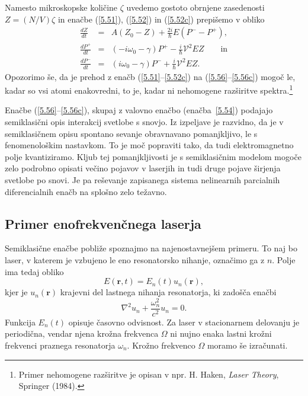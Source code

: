 Namesto mikroskopske količine $\zeta$ uvedemo gostoto obrnjene
zasedenosti $Z=(N/V)\zeta$ in enačbe (\ref{5.51}), (\ref{5.52}) in (\ref{5.52c})
prepišemo v obliko 
\begin{eqnarray}
\frac{dZ}{dt} &=& A\left(Z_0-Z\right)+\frac{2i}{\hslash}E\left(P^- - P^+\right), \label{5.56} \\
\frac{dP^+}{dt}&=&\left(-i \omega_0-\gamma\right)P^{+}-\frac{i}{\hslash} \mathcal{V}^2 E  Z \qquad 
\mathrm{in} \label{5.56b}\\
\frac{dP^-}{dt}&=&\left(i \omega_0-\gamma\right)P^{-}+\frac{i}{\hslash} \mathcal{V}^2 E  Z.\label{5.56c} 
\end{eqnarray}
Opozorimo še, da je prehod z enačb (\ref{5.51}--\ref{5.52c}) na (\ref{5.56}--\ref{5.56c}) 
mogoč le, kadar so vsi atomi enakovredni, to je, kadar ni nehomogene razširitve 
spektra.\footnote{Primer nehomogene razširitve je opisan v npr.  
H. Haken, {\it Laser Theory}, Springer (1984).}

Enačbe (\ref{5.56}--\ref{5.56c}), skupaj z valovno enačbo (enačba~\ref{5.54}) podajajo
semiklasični opis interakcij svetlobe s snovjo. Iz izpeljave je razvidno, da
je v semiklasičnem opisu spontano sevanje obravnavano pomanjkljivo, le s fenomenološkim
nastavkom. To je moč popraviti tako, da tudi elektromagnetno polje kvantiziramo. 
Kljub tej pomanjkljivosti je s semiklasičnim modelom mogoče zelo podrobno opisati 
večino pojavov v laserjih in tudi druge pojave širjenja svetlobe po snovi. Je pa 
reševanje zapisanega sistema nelinearnih parcialnih diferencialnih enačb  
na splošno zelo težavno.

\subsection*{Primer enofrekvenčnega laserja}
Semiklasične enačbe pobliže spoznajmo na najenostavnejšem primeru. To naj bo laser, 
v katerem je vzbujeno le eno resonatorsko nihanje, označimo ga z $n$.
Polje ima tedaj obliko
\begin{equation}  
\label{5.57}
E(\mathbf{r},t)= E_n(t)u_n(\mathbf{r}),
\end{equation}
kjer je $u_n(\mathbf{r})$ krajevni del lastnega nihanja resonatorja, ki
zadošča enačbi 
\begin{equation}  
\label{5.58}
\nabla^2 u_n+\frac{\omega_n^2}{c^2}u_n=0.
\end{equation}
Funkcija $E_n(t)$ opisuje časovno odvisnost. Za laser v stacionarnem
delovanju je periodična, vendar njena krožna frekvenca $\Omega$ ni nujno enaka lastni
krožni frekvenci praznega resonatorja $\omega_n$. Krožno frekvenco 
$\Omega$ moramo še izračunati.

